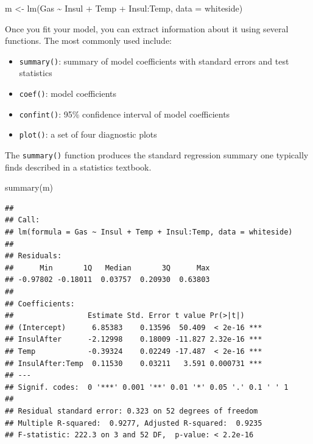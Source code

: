 \documentclass[
]{book}
\newenvironment{Shaded}{\begin{snugshade}}{\end{snugshade}}
\newcommand{\AttributeTok}[1]{\textcolor[rgb]{0.77,0.63,0.00}{#1}}
\newcommand{\FunctionTok}[1]{\textcolor[rgb]{0.00,0.00,0.00}{#1}}
\newcommand{\NormalTok}[1]{#1}
\newcommand{\OtherTok}[1]{\textcolor[rgb]{0.56,0.35,0.01}{#1}}
\newcommand{\SpecialCharTok}[1]{\textcolor[rgb]{0.00,0.00,0.00}{#1}}
\providecommand{\tightlist}{%
  \setlength{\itemsep}{0pt}\setlength{\parskip}{0pt}}
\begin{document}
\begin{Shaded}
\begin{Highlighting}[]
\NormalTok{m }\OtherTok{\textless{}{-}} \FunctionTok{lm}\NormalTok{(Gas }\SpecialCharTok{\textasciitilde{}}\NormalTok{ Insul }\SpecialCharTok{+}\NormalTok{ Temp }\SpecialCharTok{+}\NormalTok{ Insul}\SpecialCharTok{:}\NormalTok{Temp, }\AttributeTok{data =}\NormalTok{ whiteside)}
\end{Highlighting}
\end{Shaded}

Once you fit your model, you can extract information about it using several functions. The most commonly used include:

\begin{itemize}
\tightlist
\item
  \texttt{summary()}: summary of model coefficients with standard errors and test statistics
\item
  \texttt{coef()}: model coefficients
\item
  \texttt{confint()}: 95\% confidence interval of model coefficients
\item
  \texttt{plot()}: a set of four diagnostic plots
\end{itemize}

The \texttt{summary()} function produces the standard regression summary one typically finds described in a statistics textbook.

\begin{Shaded}
\begin{Highlighting}[]
\FunctionTok{summary}\NormalTok{(m)}
\end{Highlighting}
\end{Shaded}

\begin{verbatim}
## 
## Call:
## lm(formula = Gas ~ Insul + Temp + Insul:Temp, data = whiteside)
## 
## Residuals:
##      Min       1Q   Median       3Q      Max 
## -0.97802 -0.18011  0.03757  0.20930  0.63803 
## 
## Coefficients:
##                 Estimate Std. Error t value Pr(>|t|)    
## (Intercept)      6.85383    0.13596  50.409  < 2e-16 ***
## InsulAfter      -2.12998    0.18009 -11.827 2.32e-16 ***
## Temp            -0.39324    0.02249 -17.487  < 2e-16 ***
## InsulAfter:Temp  0.11530    0.03211   3.591 0.000731 ***
## ---
## Signif. codes:  0 '***' 0.001 '**' 0.01 '*' 0.05 '.' 0.1 ' ' 1
## 
## Residual standard error: 0.323 on 52 degrees of freedom
## Multiple R-squared:  0.9277, Adjusted R-squared:  0.9235 
## F-statistic: 222.3 on 3 and 52 DF,  p-value: < 2.2e-16
\end{verbatim}
\end{document}
